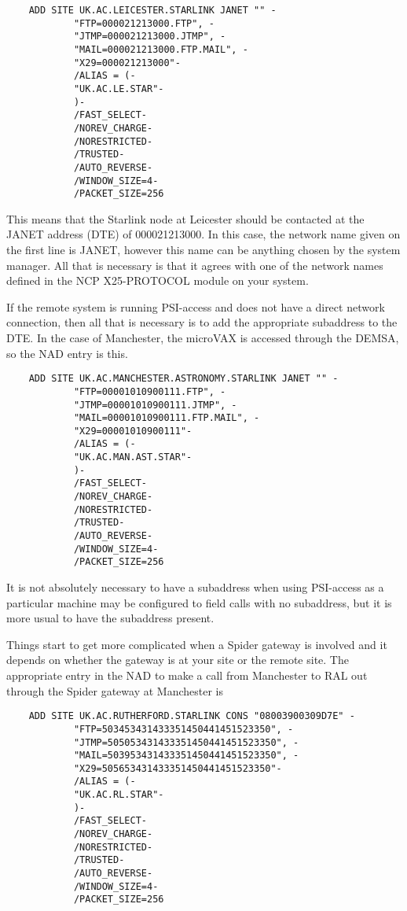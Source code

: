 \begin{verbatim}
    ADD SITE UK.AC.LEICESTER.STARLINK JANET "" -
            "FTP=000021213000.FTP", -
            "JTMP=000021213000.JTMP", -
            "MAIL=000021213000.FTP.MAIL", -
            "X29=000021213000"-
            /ALIAS = (-
            "UK.AC.LE.STAR"-
            )-
            /FAST_SELECT-
            /NOREV_CHARGE-
            /NORESTRICTED-
            /TRUSTED-
            /AUTO_REVERSE-
            /WINDOW_SIZE=4-
            /PACKET_SIZE=256
\end{verbatim}

This means that the Starlink node at Leicester should be contacted at the JANET
address (DTE) of 000021213000. In this case, the network name given on the
first line is JANET, however this name can be anything chosen by the system
manager. All that is necessary is that it agrees with one of the network names
defined in the NCP X25-PROTOCOL module on your system.

If the remote system is running PSI-access and does not have a direct network
connection, then all that is necessary is to add the appropriate subaddress to
the DTE. In the case of Manchester, the microVAX is accessed through the DEMSA,
so the NAD entry is this.

\begin{verbatim}
    ADD SITE UK.AC.MANCHESTER.ASTRONOMY.STARLINK JANET "" -
            "FTP=00001010900111.FTP", -
            "JTMP=00001010900111.JTMP", -
            "MAIL=00001010900111.FTP.MAIL", -
            "X29=00001010900111"-
            /ALIAS = (-
            "UK.AC.MAN.AST.STAR"-
            )-
            /FAST_SELECT-
            /NOREV_CHARGE-
            /NORESTRICTED-
            /TRUSTED-
            /AUTO_REVERSE-
            /WINDOW_SIZE=4-
            /PACKET_SIZE=256
\end{verbatim}

It is not absolutely necessary to have a subaddress when using PSI-access as a
particular machine may be configured to field calls with no subaddress, but it
is more usual to have the subaddress present.

Things start to get more complicated when a Spider gateway is involved and it
depends on whether the gateway is at your site or the remote site. The
appropriate entry in the NAD to make a call from Manchester to RAL out through
the Spider gateway at Manchester is

\begin{verbatim}
    ADD SITE UK.AC.RUTHERFORD.STARLINK CONS "08003900309D7E" -
            "FTP=503453431433351450441451523350", -
            "JTMP=505053431433351450441451523350", -
            "MAIL=503953431433351450441451523350", -
            "X29=505653431433351450441451523350"-
            /ALIAS = (-
            "UK.AC.RL.STAR"-
            )-
            /FAST_SELECT-
            /NOREV_CHARGE-
            /NORESTRICTED-
            /TRUSTED-
            /AUTO_REVERSE-
            /WINDOW_SIZE=4-
            /PACKET_SIZE=256
\end{verbatim}

